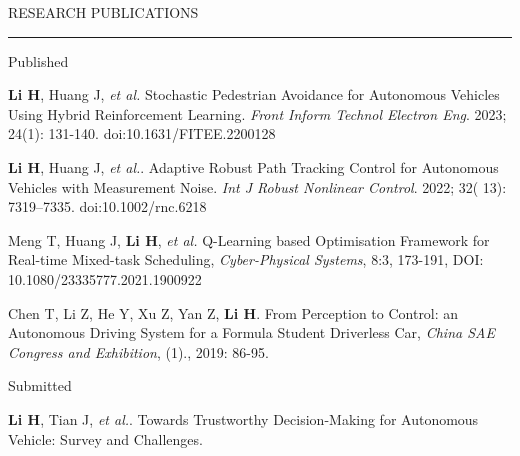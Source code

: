 \documentclass{resume} %
\renewenvironment{rSection}[1]{
\sectionskip
\textcolor{TsinghuaPurple}{\MakeUppercase{#1}}
\sectionlineskip
\hrule
\begin{list}{}{
\setlength{\leftmargin}{0em}
}
\item[]
}{
\end{list}
}
\begin{document}
\begin{rSection}{ Research Publications } \itemsep -3pt 

\begin{rSubsection}{Published}{}{}{} 
	
\item \textbf{Li H}, Huang J, \textit{et al.} Stochastic Pedestrian Avoidance for Autonomous Vehicles Using Hybrid Reinforcement Learning. \textit{Front Inform Technol Electron Eng}. 2023; 24(1): 131-140. doi:10.1631/FITEE.2200128
\href{https://lhquixotic.github.io/files/publications/FITEE.pdf}{\faExternalLink}

\item \textbf{Li H}, Huang J, \textit{et al.}. Adaptive Robust Path Tracking Control for Autonomous Vehicles with Measurement Noise. \textit{Int J Robust Nonlinear Control}. 2022; 32( 13): 7319–7335. doi:10.1002/rnc.6218 \href{https://lhquixotic.github.io/files/publications/IJNRC.pdf}{\faExternalLink}

\item  Meng T, Huang J, \textbf{Li H}, \textit{et al.} Q-Learning based Optimisation Framework for Real-time Mixed-task Scheduling, \textit{Cyber-Physical Systems}, 8:3, 173-191, DOI: 10.1080/23335777.2021.1900922 \href{https://lhquixotic.github.io/files/publications/CPS.pdf}{\faExternalLink}

\item Chen T, Li Z, He Y, Xu Z, Yan Z, \textbf{Li H}. From Perception to Control: an Autonomous Driving System for a Formula Student Driverless Car, \textit{China SAE Congress and Exhibition}, (1)., 2019: 86-95. \href{https://lhquixotic.github.io/files/publications/SAECCE.pdf}{\faExternalLink}

\end{rSubsection}

\begin{rSubsection}{Submitted}{}{}{} 
	\item \textbf{Li H}, Tian J, \textit{et al.}. Towards Trustworthy Decision-Making for Autonomous Vehicle: Survey and Challenges. 
\end{rSubsection}
 
\end{rSection}
\end{document}
